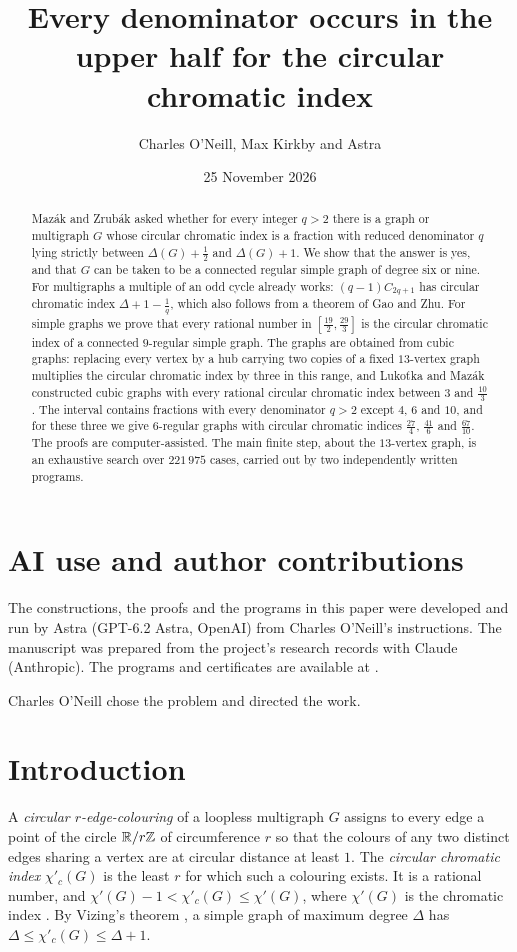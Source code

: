 \documentclass[11pt,colorlinks]{charlie}
\title{Every denominator occurs in the upper half for the circular chromatic index}
\author{Charles O'Neill, Max Kirkby and Astra}
\date{25 November 2026}
\newcommand{\cind}{\chi'_c}
\renewcommand{\aiusestatement}{The constructions, the proofs and the programs in this paper were developed and run by Astra (GPT-6.2 Astra, OpenAI) from Charles O'Neill's instructions. The manuscript was prepared from the project's research records with Claude (Anthropic). The programs and certificates are available at \coderepo.}
\begin{document}
\maketitle

\begin{abstract}
Mazák and Zrubák asked whether for every integer $q>2$ there is a graph or multigraph $G$ whose circular chromatic index is a fraction with reduced denominator $q$ lying strictly between $\Delta(G)+\frac12$ and $\Delta(G)+1$. We show that the answer is yes, and that $G$ can be taken to be a connected regular simple graph of degree six or nine. For multigraphs a multiple of an odd cycle already works: $(q-1)C_{2q+1}$ has circular chromatic index $\Delta+1-\frac1q$, which also follows from a theorem of Gao and Zhu. For simple graphs we prove that every rational number in $[\frac{19}{2},\frac{29}{3}]$ is the circular chromatic index of a connected $9$-regular simple graph. The graphs are obtained from cubic graphs: replacing every vertex by a hub carrying two copies of a fixed $13$-vertex graph multiplies the circular chromatic index by three in this range, and Lukoťka and Mazák constructed cubic graphs with every rational circular chromatic index between $3$ and $\frac{10}{3}$. The interval contains fractions with every denominator $q>2$ except $4$, $6$ and $10$, and for these three we give $6$-regular graphs with circular chromatic indices $\frac{27}{4}$, $\frac{41}{6}$ and $\frac{67}{10}$. The proofs are computer-assisted. The main finite step, about the $13$-vertex graph, is an exhaustive search over $221\,975$ cases, carried out by two independently written programs.
\end{abstract}

\section*{AI use and author contributions}
\aiusestatement

Charles O'Neill chose the problem and directed the work. \responsibilitystatement

\section{Introduction}

A \emph{circular $r$-edge-colouring} of a loopless multigraph $G$ assigns to every edge a point of the circle $\mathbb{R}/r\mathbb{Z}$ of circumference $r$ so that the colours of any two distinct edges sharing a vertex are at circular distance at least $1$. The \emph{circular chromatic index} $\cind(G)$ is the least $r$ for which such a colouring exists. It is a rational number, and $\chi'(G)-1<\cind(G)\le\chi'(G)$, where $\chi'(G)$ is the chromatic index \cite{Zhu01}. By Vizing's theorem \cite{Vizing}, a simple graph of maximum degree $\Delta$ has $\Delta\le\cind(G)\le\Delta+1$.
\end{document}

